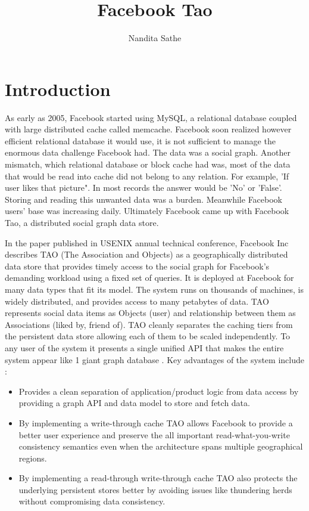 \documentclass[9pt,twocolumn,twoside]{../../styles/osajnl}
\title{Facebook Tao}
\author[1,*]{Nandita Sathe}
\affil[1]{School of Informatics and Computing, Bloomington, IN 47408, U.S.A.}
\affil[*]{Corresponding author: nsathe@iu.edu}
\begin{document}
\maketitle

\section{Introduction}

As early as 2005, Facebook started using MySQL, a relational database coupled with large distributed cache called memcache. Facebook soon realized however efficient relational database it would use, it is not sufficient to manage the enormous data challenge Facebook had. The data was a social graph. Another mismatch, which relational database or block cache had was, most of the data that would be read into cache did not belong to any relation. For example, 'If user likes that picture". In most records the answer would be 'No' or 'False'. Storing and reading this unwanted data was a burden. Meanwhile Facebook users' base was increasing daily. Ultimately Facebook came up with Facebook Tao, a distributed social graph data store.

In the paper published in USENIX annual technical conference, Facebook Inc describes TAO (The Association and Objects) as \cite{book-tao1} a geographically distributed data store that provides timely access to the social graph for Facebook’s demanding workload using a fixed set of queries. It is deployed at Facebook for many data types that fit its model. The system runs on thousands of machines, is widely distributed, and provides access to many petabytes of data. TAO represents social data items as Objects (user) and relationship between them as Associations (liked by, friend of). TAO cleanly separates the caching tiers from the persistent data store allowing each of them to be scaled independently. To any user of the system it presents a single unified API that makes the entire system appear like 1 giant graph database \cite{www-tao1}.
Key advantages of the system include \cite{www-tao1}:
\begin{itemize}
\item Provides a clean separation of application/product logic from data access by providing a graph API and data model to store and fetch data.
\item By implementing a write-through cache TAO allows Facebook to provide a better user experience and preserve the all important read-what-you-write consistency semantics even when the architecture spans multiple geographical regions.
\item By implementing a read-through write-through cache TAO also protects the underlying persistent stores better by avoiding issues like thundering herds without compromising data consistency.

\end{itemize}
\end{document}
